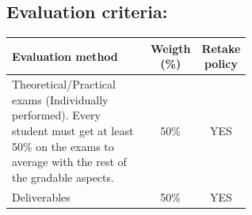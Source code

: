 \documentclass[spanish,12pt,a4paper]{article}
\begin{document}
\subsection*{Evaluation criteria:}

\begin{table}[H]
\def\arraystretch{1.5}
\begin{tabular}{|p{0.6\linewidth}|c|c|}
\hline
\textbf{Evaluation method} & \textbf{Weigth} (\%) & \textbf{Retake policy} \\
\hline
\hline
Theoretical/Practical exams (Individually performed). Every student must get at least 50\% on the exams to average with the rest of the gradable aspects. & 50\% & YES \\
\hline
Deliverables & 50\% & YES \\
\hline
\end{tabular}
\end{table}

\newpage
\end{document}
